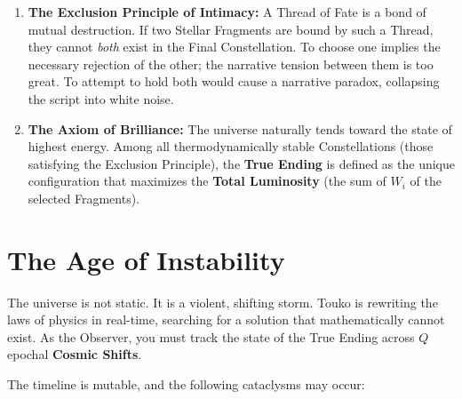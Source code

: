 \documentclass[11pt, letterpaper]{article}
\begin{document}
\begin{enumerate}
    \item \textbf{The Exclusion Principle of Intimacy:} 
    A Thread of Fate is a bond of mutual destruction. If two Stellar Fragments are bound by such a Thread, they cannot \textit{both} exist in the Final Constellation. To choose one implies the necessary rejection of the other; the narrative tension between them is too great. To attempt to hold both would cause a narrative paradox, collapsing the script into white noise.
    
    \item \textbf{The Axiom of Brilliance:} 
    The universe naturally tends toward the state of highest energy. Among all thermodynamically stable Constellations (those satisfying the Exclusion Principle), the \textbf{True Ending} is defined as the unique configuration that maximizes the \textbf{Total Luminosity} (the sum of $W_i$ of the selected Fragments).
\end{enumerate}

\section*{The Age of Instability}

The universe is not static. It is a violent, shifting storm. Touko is rewriting the laws of physics in real-time, searching for a solution that mathematically cannot exist. As the Observer, you must track the state of the True Ending across $Q$ epochal \textbf{Cosmic Shifts}. 

The timeline is mutable, and the following cataclysms may occur:
\end{document}
